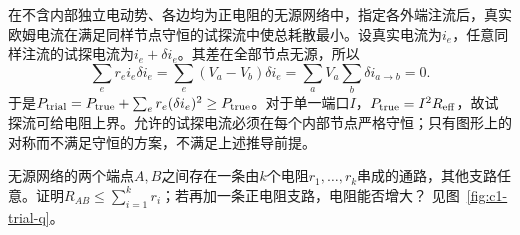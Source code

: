 在不含内部独立电动势、各边均为正电阻的无源网络中，指定各外端注流后，真实欧姆电流在满足同样节点守恒的试探流中使总耗散最小。设真实电流为$i_e$，任意同样注流的试探电流为$i_e+\delta i_e$。其差在全部节点无源，所以
\[
 \sum_e r_e i_e\delta i_e
 =\sum_e(V_a-V_b)\delta i_e
 =\sum_aV_a\sum_b\delta i_{a\to b}=0.
\]
于是$P_{\rm trial}=P_{\rm true}+\sum_e r_e(\delta i_e)^2\ge P_{\rm true}$。对于单一端口$I$，$P_{\rm true}=I^2R_{\rm eff}$，故试探流可给电阻上界。允许的试探电流必须在每个内部节点严格守恒；只有图形上的对称而不满足守恒的方案，不满足上述推导前提。

\begin{example}[用一条通路给网络电阻上界]\label{ex:c1-trial}
无源网络的两个端点$A,B$之间存在一条由$k$个电阻$r_1,\ldots,r_k$串成的通路，其他支路任意。证明$R_{AB}\le\sum_{i=1}^kr_i$；若再加一条正电阻支路，电阻能否增大？ 见图~\ref{fig:c1-trial-q}。
\end{example}

